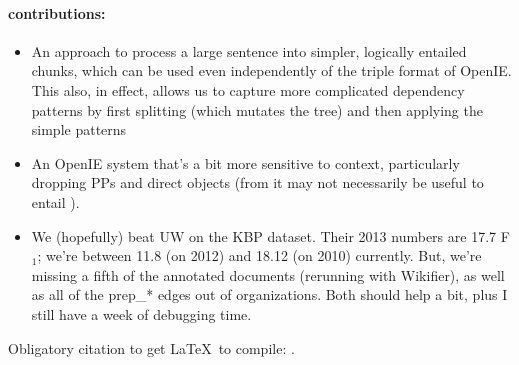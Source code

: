 \paragraph{contributions:}
\begin{itemize}
  \item An approach to process a large sentence into simpler, logically
    entailed chunks, which can be used even independently of the triple
    format of OpenIE. This also, in effect, allows us to capture more
    complicated dependency patterns by first splitting (which mutates
    the tree) and then applying the simple patterns
  
  \item An OpenIE system that's a bit more sensitive to context, particularly
    dropping PPs and direct objects (from 
    it may not necessarily be useful to entail ).

  \item We (hopefully) beat UW on the KBP dataset. Their 2013 numbers are
    17.7 F$_1$; we're between 11.8 (on 2012) and 18.12 (on 2010) currently.
    But, we're missing a fifth of the annotated documents (rerunning with
    Wikifier), as well as all of the prep\_* edges out of organizations.
    Both should help a bit, plus I still have a week of debugging time.
\end{itemize}

Obligatory citation to get \LaTeX\ to compile: .

